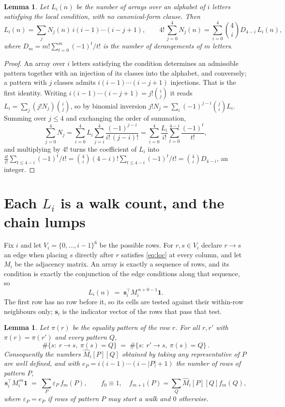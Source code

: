 \documentclass[11pt,a4paper]{article}
\theoremstyle{plain}
\newtheorem{lemma}[theorem]{Lemma}
\theoremstyle{definition}
\begin{document}
\begin{lemma}\label{lem:inv}
Let $L_i(n)$ be the number of arrays over an alphabet of $i$ letters satisfying the local
condition, with no canonical-form clause. Then
\[
L_i(n)=\sum_j N_j(n)\,i(i-1)\cdots(i-j+1),
\qquad
4!\,\sum_{j=0}^{4}N_j(n)=\sum_{i=0}^{4}\binom{4}{i}D_{4-i}\,L_i(n),
\]
where $D_m=m!\sum_{t=0}^{m}(-1)^t/t!$ is the number of derangements of $m$ letters.
\end{lemma}

\begin{proof}
An array over $i$ letters satisfying the condition determines an admissible pattern together
with an injection of its classes into the alphabet, and conversely; a pattern with $j$
classes admits $i(i-1)\cdots(i-j+1)$ injections. That is the first identity. Writing
$i(i-1)\cdots(i-j+1)=j!\binom{i}{j}$ it reads $L_i=\sum_j (j!N_j)\binom{i}{j}$, so by
binomial inversion $j!N_j=\sum_{i}(-1)^{j-i}\binom{j}{i}L_i$. Summing over
$j\le 4$ and exchanging the order of summation,
\[
\sum_{j=0}^{4}N_j=\sum_{i=0}^{4}L_i\sum_{j=i}^{4}\frac{(-1)^{j-i}}{i!\,(j-i)!}
=\sum_{i=0}^{4}\frac{L_i}{i!}\sum_{t=0}^{4-i}\frac{(-1)^t}{t!} ,
\]
and multiplying by $4!$ turns the coefficient of $L_i$ into
$\frac{4!}{i!}\sum_{t\le 4-i}(-1)^t/t!=\binom{4}{i}(4-i)!\sum_{t\le 4-i}(-1)^t/t!
=\binom{4}{i}D_{4-i}$, an integer.
\end{proof}

\section{Each $L_i$ is a walk count, and the chain lumps}

Fix $i$ and let $V_i=\{0,\dots,i-1\}^{6}$ be the possible rows. For $r,s\in V_i$
declare $r\to s$ an edge when placing $s$ directly after $r$ satisfies \eqref{eq:loc} at
every column, and let $M_i$ be the adjacency matrix. An array is exactly a sequence of
rows, and its condition is exactly the conjunction of the edge conditions along that
sequence, so
\[
L_i(n)\;=\;\mathbf{s}_i^{\!\top}M_i^{\,n+0-1}\mathbf{1} .
\]
The first row has no row before it, so its cells are tested
against their within-row neighbours only; $\mathbf{s}_i$ is the indicator vector of the
rows that pass that test.

\begin{lemma}\label{lem:lump}
Let $\pi(r)$ be the equality pattern of the row $r$. For all $r,r'$ with
$\pi(r)=\pi(r')$ and every pattern $Q$,
\[
\#\{s:\ r\to s,\ \pi(s)=Q\}\;=\;\#\{s:\ r'\to s,\ \pi(s)=Q\}\, .
\]
Consequently the numbers $\widehat M_i[P][Q]$ obtained by taking any representative of $P$
are well defined, and with $e_P=i(i-1)\cdots(i-|P|+1)$ the number of rows of pattern $P$,
\[
\mathbf{s}_i^{\!\top}M_i^{\,m}\mathbf{1}\;=\;\sum_P \varepsilon_P\,f_m(P),
\qquad f_0\equiv1,\quad f_{m+1}(P)=\sum_Q\widehat M_i[P][Q]f_m(Q),
\]
where $\varepsilon_P=e_P$ if rows of pattern $P$ may start a walk and $0$ otherwise.
\end{lemma}
\end{document}
